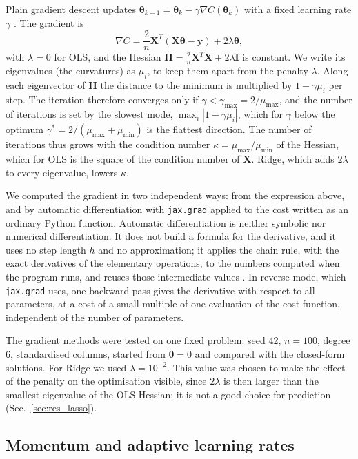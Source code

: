 Plain gradient descent updates $\boldsymbol{\theta}_{k+1} = \boldsymbol{\theta}_k - \gamma \nabla C(\boldsymbol{\theta}_k)$ with a fixed learning rate $\gamma$ \cite[Secs.~4.3--4.5]{HjorthJensen2026}. The gradient is
$$
\nabla C = \frac{2}{n}\mathbf{X}^T(\mathbf{X}\boldsymbol{\theta} - \mathbf{y}) + 2\lambda\boldsymbol{\theta},
$$
with $\lambda = 0$ for OLS, and the Hessian $\mathbf{H} = \frac{2}{n}\mathbf{X}^T\mathbf{X} + 2\lambda\mathbf{I}$ is constant. We write its eigenvalues (the curvatures) as $\mu_i$, to keep them apart from the penalty $\lambda$. Along each eigenvector of $\mathbf{H}$ the distance to the minimum is multiplied by $1 - \gamma\mu_i$ per step. The iteration therefore converges only if $\gamma < \gamma_{\max} = 2/\mu_{\max}$, and the number of iterations is set by the slowest mode, $\max_i |1 - \gamma\mu_i|$, which for $\gamma$ below the optimum $\gamma^* = 2/(\mu_{\max} + \mu_{\min})$ is the flattest direction. The number of iterations thus grows with the condition number $\kappa = \mu_{\max}/\mu_{\min}$ of the Hessian, which for OLS is the square of the condition number of $\mathbf{X}$. Ridge, which adds $2\lambda$ to every eigenvalue, lowers $\kappa$.

We computed the gradient in two independent ways: from the expression above, and by automatic differentiation with \texttt{jax.grad} \cite{Jax2018} applied to the cost written as an ordinary Python function. Automatic differentiation is neither symbolic nor numerical differentiation. It does not build a formula for the derivative, and it uses no step length $h$ and no approximation; it applies the chain rule, with the exact derivatives of the elementary operations, to the numbers computed when the program runs, and reuses those intermediate values \cite[Sec.~4.14]{HjorthJensen2026}. In reverse mode, which \texttt{jax.grad} uses, one backward pass gives the derivative with respect to all parameters, at a cost of a small multiple of one evaluation of the cost function, independent of the number of parameters.

The gradient methods were tested on one fixed problem: seed 42, $n = 100$, degree 6, standardised columns, started from $\boldsymbol{\theta} = 0$ and compared with the closed-form solutions. For Ridge we used $\lambda = 10^{-2}$. This value was chosen to make the effect of the penalty on the optimisation visible, since $2\lambda$ is then larger than the smallest eigenvalue of the OLS Hessian; it is not a good choice for prediction (Sec.~\ref{sec:res_lasso}).

\subsection{Momentum and adaptive learning rates}\label{sec:adaptive}

